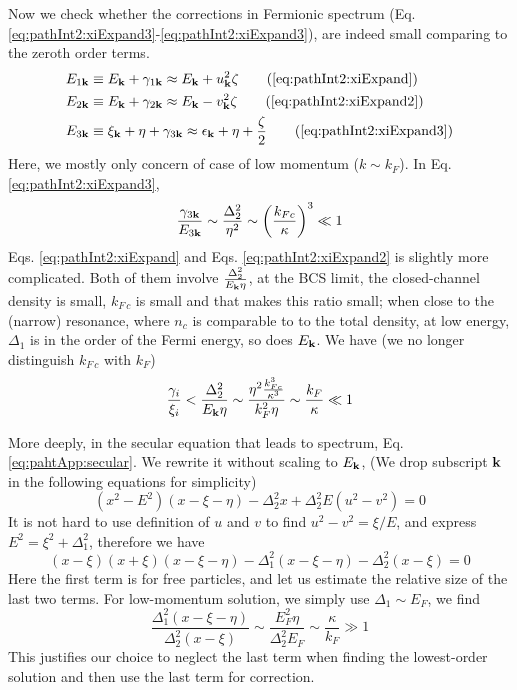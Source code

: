 Now we check whether the corrections in Fermionic spectrum (Eq. \ref{eq:pathInt2:xiExpand3}-\ref{eq:pathInt2:xiExpand3}), 
are indeed small comparing to the zeroth order terms.  
\begin{align}
E_{1\vk}&\equiv{}E_{\vk}+\gamma_{1\vk}\approx{}E_{\vk}+u_{\vk}^{2}\zeta\tag{\ref{eq:pathInt2:xiExpand}}\\
E_{2\vk}&\equiv{}E_{\vk}+\gamma_{2\vk}
\approx{}E_{\vk}-v_{\vk}^{2}\zeta\tag{\ref{eq:pathInt2:xiExpand2}}\\
E_{3\vk}&\equiv{}\xi_{\vk}+\eta+\gamma_{3\vk}\approx{}\epsilon_{\vk}+\eta+\frac{\zeta}{2}
\tag{\ref{eq:pathInt2:xiExpand3}}
\end{align}
Here, we mostly only concern of case of low momentum ($k\sim{}k_{F}$).  In Eq. \ref{eq:pathInt2:xiExpand3}, 
\begin{equation*}
\frac{\gamma_{3\mathbf{k}}}{E_{3\mathbf{k}}}\sim{}\frac{\Delta_{2}^{2}}{\eta^{2}}\sim\left(\frac{k_{Fc}}{\kappa}\right)^{3}\ll1
\end{equation*}
Eqs. \ref{eq:pathInt2:xiExpand} and Eqs. \ref{eq:pathInt2:xiExpand2} is slightly more complicated.  Both of them involve $\frac{\Delta_{2}^{2}}{E_{\mathbf{k}}\eta}$,  at the  BCS limit, the closed-channel density is small, $k_{F\,c}$ is small and that makes this ratio small; when close to the (narrow) resonance, where $n_{c}$ is comparable to to the total density, at low energy, $\Delta_{1}$ is in the order of the Fermi energy, so does $E_{\mathbf{k}}$.   We have (we no longer distinguish $k_{F\,c}$ with $k_{F}$)
 \begin{equation*}
 \frac{\gamma_{i}}{\xi_{i}}<\frac{\Delta_{2}^{2}}{E_{\mathbf{k}}\eta}\sim\frac{\eta^{2}\frac{k_{Fc}^{3}}{\kappa^{3}}}{k_{F}^{2}\eta}\sim\frac{k_{F}}{\kappa}\ll1
\end{equation*}

More deeply, in the secular equation that leads to spectrum, Eq. \ref{eq:pahtApp:secular}.  We rewrite it without scaling to $E_{\mathbf{k}}$,  (We drop subscript $\mathbf{k}$ in the following equations for simplicity)
\begin{equation*}
(x^{2}-E^{2})(x-\xi-\eta)-\Delta_{2}^{2}x+\Delta_{2}^{2}E(u^{2}-v^{2})=0
\end{equation*}
It is not hard to use definition of $u$ and $v$ to find $u^{2}-v^{2}=\xi/E$, and express $E^{2}=\xi^{2}+\Delta_{1}^{2}$, therefore we have
\begin{equation*}
(x-\xi)(x+\xi)(x-\xi-\eta)-\Delta_{1}^{2}(x-\xi-\eta)-\Delta_{2}^{2}(x-\xi)=0
\end{equation*}
Here the first term is for free particles, and let us estimate the relative size of the last two terms.  For low-momentum solution, we simply use $\Delta_{1}\sim{}E_{F}$, we find
\begin{equation*}
\frac{\Delta_{1}^{2}(x-\xi-\eta)}{\Delta_{2}^{2}(x-\xi)}\sim\frac{E_{F}^{2}\eta}{\Delta_{2}^{2}E_{F}}\sim\frac{\kappa}{k_{F}}\gg1
\end{equation*}
This justifies our choice to neglect the last term when finding the lowest-order solution and then use the last term for correction.  

